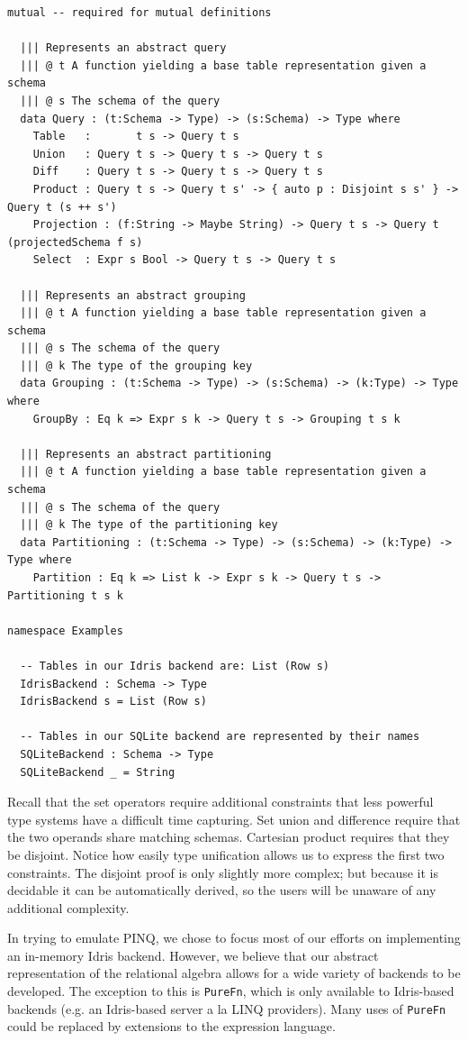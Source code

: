 \documentclass[12pt]{article}
\begin{document}
\begin{lstlisting}
mutual -- required for mutual definitions

  ||| Represents an abstract query
  ||| @ t A function yielding a base table representation given a schema
  ||| @ s The schema of the query
  data Query : (t:Schema -> Type) -> (s:Schema) -> Type where
    Table   :       t s -> Query t s
    Union   : Query t s -> Query t s -> Query t s
    Diff    : Query t s -> Query t s -> Query t s
    Product : Query t s -> Query t s' -> { auto p : Disjoint s s' } -> Query t (s ++ s')
    Projection : (f:String -> Maybe String) -> Query t s -> Query t (projectedSchema f s)
    Select  : Expr s Bool -> Query t s -> Query t s

  ||| Represents an abstract grouping
  ||| @ t A function yielding a base table representation given a schema
  ||| @ s The schema of the query
  ||| @ k The type of the grouping key
  data Grouping : (t:Schema -> Type) -> (s:Schema) -> (k:Type) -> Type where
    GroupBy : Eq k => Expr s k -> Query t s -> Grouping t s k

  ||| Represents an abstract partitioning
  ||| @ t A function yielding a base table representation given a schema
  ||| @ s The schema of the query
  ||| @ k The type of the partitioning key
  data Partitioning : (t:Schema -> Type) -> (s:Schema) -> (k:Type) -> Type where
    Partition : Eq k => List k -> Expr s k -> Query t s -> Partitioning t s k

namespace Examples

  -- Tables in our Idris backend are: List (Row s)
  IdrisBackend : Schema -> Type
  IdrisBackend s = List (Row s)

  -- Tables in our SQLite backend are represented by their names
  SQLiteBackend : Schema -> Type
  SQLiteBackend _ = String
\end{lstlisting}

Recall that the set operators require additional constraints that less powerful type systems have a difficult time capturing.
Set union and difference require that the two operands share matching schemas.
Cartesian product requires that they be disjoint.
Notice how easily type unification allows us to express the first two constraints.
The disjoint proof is only slightly more complex; but because it is decidable it can be automatically derived, so the users will be unaware of any additional complexity.


In trying to emulate PINQ, we chose to focus most of our efforts on implementing an in-memory Idris backend.
However, we believe that our abstract representation of the relational algebra allows for a wide variety of backends to be developed.
The exception to this is \texttt{PureFn}, which is only available to Idris-based backends (e.g. an Idris-based server a la LINQ providers).
Many uses of \texttt{PureFn} could be replaced by extensions to the expression language.
\end{document}
